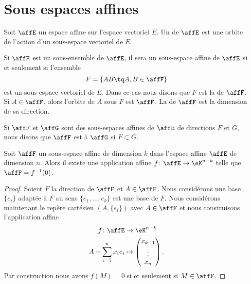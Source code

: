 \section{Sous espaces affines}

\begin{definition}
    Soit \( \affE\) un espace affine sur l'espace vectoriel \( E\). Un  de \( \affE\) est une orbite de l'action d'un sous-espace vectoriel de \( E\).
\end{definition}

Si \( \affF\) est un sous-ensemble de \( \affE\), il sera un sous-espace affine de \( \affE\) si et seulement si l'ensemble
\begin{equation}
    F=\{ AB\tq A,B\in\affF \}
\end{equation}
est un sous-espace vectoriel de \( E\). Dans ce cas nous disons que \( F\) est la  de \( \affF\). Si \( A\in\affF\), alors l'orbite de \( A\) sous \( F\) est \( \affF\). La  de \( \affF\) est la dimension de sa direction.

Si \( \affF\) et \( \affG\) sont des sous-espaces affines de \( \affE\) de directions \( F\) et \( G\), nous disons que \( \affF\) est  à \( \affG\) si \( F\subset G\).

\begin{proposition}
    Soit \( \affF\) un sous-espace affine de dimension \( k\) dans l'espace affine \( \affE\) de dimension \( n\). Alors il existe une application affine \( f\colon \affE\to \eK^{n-k}\) telle que \( \affF=f^{-1}(0)\).
\end{proposition}

\begin{proof}
    Soient \( F\) la direction de \( \affF\) et \( A\in\affF\). Nous considérons une base \( \{ e_i \}\) adaptée à \( F\) au sens \( \{ e_1,\ldots, e_k \}\) est une base de \( F\). Nous considérons maintenant le repère cartésien \( (A,\{ e_i \})\) avec \( A\in\affF\) et nous construisons l'application affine
    \begin{equation}
        \begin{aligned}
            f\colon \affE&\to \eK^{n-k} \\
            A+\sum_{i=1}^nx_ie_i&\mapsto \begin{pmatrix}
                x_{k+1}    \\
                \vdots    \\
                x_n
            \end{pmatrix}.
        \end{aligned}
    \end{equation}
    Par construction nous avons \( f(M)=0\) si et seulement si \( M\in\affF\).
\end{proof}

